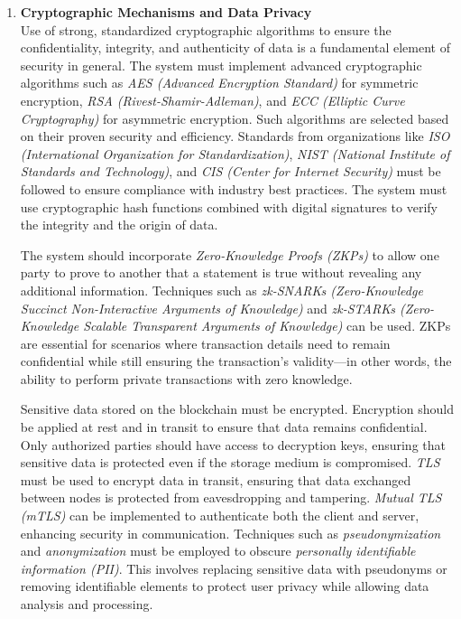 \begin{enumerate}[label=\textbullet]
	\item\textbf{Cryptographic Mechanisms and Data Privacy}\cite{sub_crypto}\cite{zkp_pub_85}\\
	Use of strong, standardized cryptographic algorithms to ensure the confidentiality, integrity, and authenticity of data is a fundamental element of security in general. The system must implement advanced cryptographic algorithms such as \textit{AES (Advanced Encryption Standard)} for symmetric encryption, \textit{RSA (Rivest-Shamir-Adleman)}, and \textit{ECC (Elliptic Curve Cryptography)} for asymmetric encryption. Such algorithms are selected based on their proven security and efficiency. Standards from organizations like \textit{ISO (International Organization for Standardization)}, \textit{NIST (National Institute of Standards and Technology)}, and \textit{CIS (Center for Internet Security)} must be followed to ensure compliance with industry best practices. The system must use cryptographic hash functions combined with digital signatures to verify the integrity and the origin of data.
	
	The system should incorporate \textit{Zero-Knowledge Proofs (ZKPs)} to allow one party to prove to another that a statement is true without revealing any additional information. Techniques such as \textit{zk-SNARKs (Zero-Knowledge Succinct Non-Interactive Arguments of Knowledge)} and \textit{zk-STARKs (Zero-Knowledge Scalable Transparent Arguments of Knowledge)} can be used. ZKPs are essential for scenarios where transaction details need to remain confidential while still ensuring the transaction's validity—in other words, the ability to perform private transactions with zero knowledge.
	
	Sensitive data stored on the blockchain must be encrypted. Encryption should be applied at rest and in transit to ensure that data remains confidential. Only authorized parties should have access to decryption keys, ensuring that sensitive data is protected even if the storage medium is compromised. \textit{TLS} must be used to encrypt data in transit, ensuring that data exchanged between nodes is protected from eavesdropping and tampering. \textit{Mutual TLS (mTLS)} can be implemented to authenticate both the client and server, enhancing security in communication. Techniques such as \textit{pseudonymization} and \textit{anonymization} must be employed to obscure \textit{personally identifiable information (PII)}. This involves replacing sensitive data with pseudonyms or removing identifiable elements to protect user privacy while allowing data analysis and processing.


\end{enumerate}
